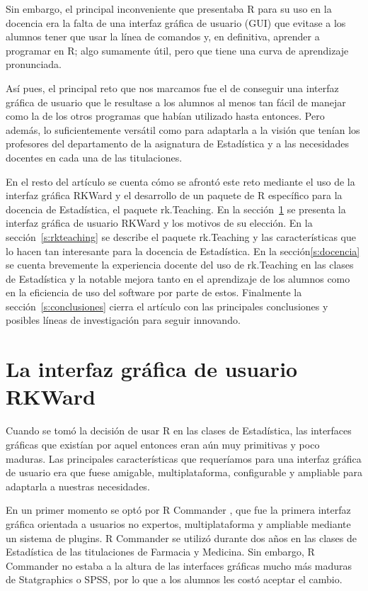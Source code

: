 \documentclass[a4paper,10pt,twoside]{article}
\newcommand{\rkteaching}{\textsf{rk.Teaching}}
\newcommand{\rkward}{\textsf{RKWard}}
\newcommand{\spss}{\textsf{SPSS}}
\newcommand{\statgraphics}{\textsf{Statgraphics}}
\newcommand{\rcommander}{\textsf{R Commander}}
\begin{document}
Sin embargo, el principal inconveniente que presentaba R para su uso en la docencia era la falta de una interfaz
gráfica de usuario (GUI) que evitase a los alumnos tener que usar la línea de comandos y, en definitiva, aprender a
programar en R; algo sumamente útil, pero que tiene una curva de aprendizaje pronunciada. 

Así pues, el principal reto que nos marcamos fue el de conseguir una interfaz gráfica de usuario que le resultase a los
alumnos al menos tan fácil de manejar como la de los otros programas que habían utilizado hasta entonces.
Pero además, lo suficientemente versátil como para adaptarla a la visión que tenían los profesores del departamento de
la asignatura de Estadística y a las necesidades docentes en cada una de las titulaciones.

En el resto del artículo se cuenta cómo se afrontó este reto mediante el uso de la interfaz gráfica \rkward{} y el
desarrollo de un paquete de R específico para la docencia de Estadística, el paquete \rkteaching. 
En la sección~\ref{s:rkward} se presenta la interfaz gráfica de usuario \rkward{} y los motivos de su elección. 
En la sección~\ref{s:rkteaching} se describe el paquete \rkteaching{} y las características que lo hacen tan interesante
para la docencia de Estadística. 
En la sección\ref{s:docencia} se cuenta brevemente la experiencia docente del uso de rk.Teaching en las clases de
Estadística y la notable mejora tanto en el aprendizaje de los alumnos como en la eficiencia de uso del software por
parte de estos. 
Finalmente la sección~\ref{s:conclusiones} cierra el artículo con las principales conclusiones y posibles líneas de
investigación para seguir innovando.


\section{La interfaz gráfica de usuario \rkward}
\label{s:rkward}
Cuando se tomó la decisión de usar R en las clases de Estadística, las interfaces gráficas que existían por aquel
entonces eran aún muy primitivas y poco maduras.
Las principales características que requeríamos para una interfaz gráfica de usuario era que fuese amigable,
multiplataforma, configurable y ampliable para adaptarla a nuestras necesidades.

En un primer momento se optó por \rcommander{} \cite{fox2005r}, que fue la primera interfaz gráfica orientada a
usuarios no expertos, multiplataforma y ampliable mediante un sistema de plugins.
\rcommander{} se utilizó durante dos años en las clases de Estadística de las titulaciones de Farmacia y
Medicina.
Sin embargo, \rcommander{} no estaba a la altura de las interfaces gráficas mucho más maduras de \statgraphics{} o
\spss{}, por lo que a los alumnos les costó aceptar el cambio. 
\end{document}
